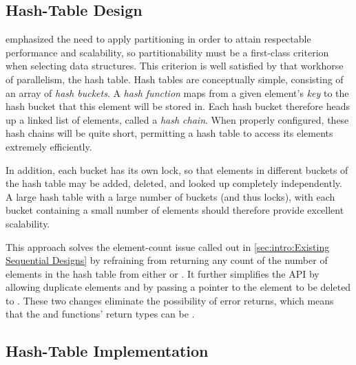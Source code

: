 \subsection{Hash-Table Design}
\label{sec:datastruct:Hash-Table Design}

emphasized the need to apply partitioning in order to attain
respectable performance and scalability, so partitionability
must be a first-class criterion when selecting data structures.
This criterion is well satisfied by that workhorse of parallelism,
the hash table.
Hash tables are conceptually simple, consisting of an array of
\emph{hash buckets}.
A \emph{hash function} maps from a given element's \emph{key}
to the hash bucket that this element will be stored in.
Each hash bucket therefore heads up a linked list of elements,
called a \emph{hash chain}.
When properly configured, these hash chains will be quite short,
permitting a hash table to access its elements extremely efficiently.

\QuickQuizEnd

In addition, each bucket has its own lock, so that elements in different
buckets of the hash table may be added, deleted, and looked up completely
independently.
A large hash table with a large number of buckets (and thus locks), with
each bucket containing a small number of elements should therefore provide
excellent scalability.

This approach solves the element-count issue called out in
\cref{sec:intro:Existing Sequential Designs}
by refraining from returning any count of the number of elements in
the hash table from either  or .
It further simplifies the API by allowing duplicate elements and by
passing a pointer to the element to be deleted to .
These two changes eliminate the possibility of error returns, which
means that the  and  functions'
return types can be .

\subsection{Hash-Table Implementation}
\label{sec:datastruct:Hash-Table Implementation}

